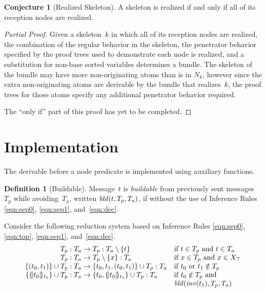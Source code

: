 \documentclass[12pt]{report}
\theoremstyle{definition}
\newtheorem{defn}{Definition}[chapter]
\newtheorem{conj}[thm]{Conjecture}
\begin{document}
\begin{conj}[Realized Skeleton]
A skeleton is realized if and only if all of its reception nodes are
realized.
\end{conj}

\begin{proof}[Partial Proof]
Given a skeleton~$k$ in which all of its reception nodes are realized,
the combination of the regular behavior in the skeleton, the
penetrator behavior specified by the proof trees used to demonstrate
each node is realized, and a substitution for non-base sorted
variables determines a bundle.  The skeleton of the bundle may have
more non-originating atoms than is in $N_k$, however since the
extra non-originating atoms are derivable by the bundle that
realizes~$k$, the proof trees for those atoms specify any additional
penetrator behavior required.

The ``only if'' part of this proof has yet to be completed.
\end{proof}

\section{Implementation}\label{sec:derivable implementation}

The derivable before a node predicate is implemented using auxiliary
functions.

\begin{defn}[Buildable]
Message~$t$ is \emph{buildable} from previously sent
messages~$T_p$ while avoiding~$T_a$, written $\operatorname{\mathit{bld}}(t,T_p,T_a)$, if
 without the use of Inference Rules \ref{eqn:sep0},
\ref{eqn:sep1}, and~\ref{eqn:dec}.
\end{defn}

Consider the following reduction system based on Inference Rules
\ref{eqn:sep0}, \ref{eqn:top}, \ref{eqn:sep1}, and~\ref{eqn:dec}.
$$\begin{array}{r@{}c@{}ll}
\dctx{T_p}{T_a}&{}\to{}&\dctx{T_p}{T_a\setminus\{t\}}
&\mbox{if $t\in T_p$ and $t\in T_a$}\\
\dctx{T_p}{T_a}&{}\to{}&\dctx{T_p\setminus\{x\}}{T_a}
&\mbox{if $x\in T_p$ and $x\in X_{\top}$}\\
\dctx{\{(t_0,t_1)\}\cup T_p}{T_a}&{}\to{}
&\dctx{\{t_0,t_1,(t_0,t_1)\}\cup T_p}{T_a}
&\mbox{if $t_0$ or $t_1\notin T_p$}\\
\dctx{\{\enc{t_0}{t_1}\}\cup
T_p}{T_a}&{}\to{}&\dctx{\{t_0,\enc{t_0}{t_1}\}\cup T_p}{T_a}
&\mbox{if $t_0\notin T_p$ and}\\
&&&\fn{bld}(\fn{inv}(t_1),T_p,T_a)
\end{array}$$
\end{document}
